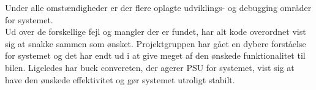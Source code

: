 Under alle omstændigheder er der flere oplagte udviklings- og debugging områder for systemet.\\

Ud over de forskellige fejl og mangler der er fundet, har alt kode overordnet vist sig at snakke sammen som ønsket. Projektgruppen har gået en dybere forståelse for systemet og det har endt ud i at give meget af den ønskede funktionalitet til bilen.
Ligeledes har buck convereten, der agerer PSU for systemet, vist sig at have den ønskede effektivitet og gør systemet utroligt stabilt.

\clearpage